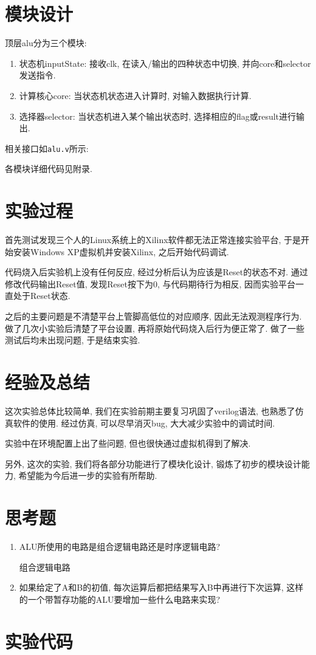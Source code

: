 \section{模块设计}
顶层alu分为三个模块:
\begin{enumerate}
  \item 状态机inputState: 接收clk, 在读入/输出的四种状态中切换, 并向core和selector发送指令.
  \item 计算核心core: 当状态机状态进入计算时, 对输入数据执行计算.
  \item 选择器selector: 当状态机进入某个输出状态时, 选择相应的flag或result进行输出.
\end{enumerate}
相关接口如\verb|alu.v|所示:

各模块详细代码见附录.

\section{实验过程}
首先测试发现三个人的Linux系统上的Xilinx软件都无法正常连接实验平台,
于是开始安装Windows XP虚拟机并安装Xilinx, 之后开始代码调试.

代码烧入后实验机上没有任何反应, 经过分析后认为应该是Reset的状态不对.
通过修改代码输出Reset值, 发现Reset按下为0, 与代码期待行为相反, 因而实验平台一直处于Reset状态.

之后的主要问题是不清楚平台上管脚高低位的对应顺序, 因此无法观测程序行为.
做了几次小实验后清楚了平台设置, 再将原始代码烧入后行为便正常了.
做了一些测试后均未出现问题, 于是结束实验.

\section{经验及总结}
这次实验总体比较简单, 我们在实验前期主要复习巩固了verilog语法,
也熟悉了仿真软件的使用.
经过仿真, 可以尽早消灭bug, 大大减少实验中的调试时间.

实验中在环境配置上出了些问题, 但也很快通过虚拟机得到了解决.

另外, 这次的实验, 我们将各部分功能进行了模块化设计,
锻炼了初步的模块设计能力, 希望能为今后进一步的实验有所帮助.

\section{思考题}
\begin{enumerate}
  \item ALU所使用的电路是组合逻辑电路还是时序逻辑电路?

    组合逻辑电路

  \item 如果给定了A和B的初值, 每次运算后都把结果写入B中再进行下次运算,
    这样的一个带暂存功能的ALU要增加一些什么电路来实现?


\end{enumerate}


\section{实验代码}
